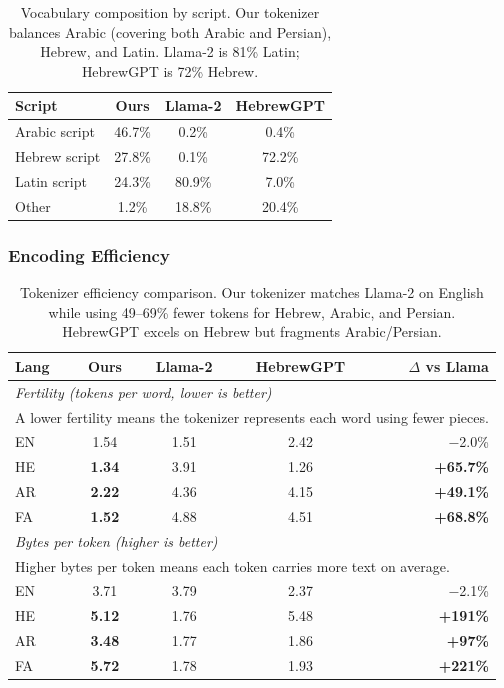 \documentclass[10pt,twocolumn]{article}
\begin{document}
\begin{table}[H]
\centering\small
\begin{tabular}{lccc}
\toprule
\textbf{Script} & \textbf{Ours} & \textbf{Llama-2} & \textbf{HebrewGPT} \\
\midrule
Arabic script & 46.7\% & 0.2\% & 0.4\% \\
Hebrew script & 27.8\% & 0.1\% & 72.2\% \\
Latin script & 24.3\% & 80.9\% & 7.0\% \\
Other & 1.2\% & 18.8\% & 20.4\% \\
\bottomrule
\end{tabular}
\caption{Vocabulary composition by script. Our tokenizer balances Arabic (covering both Arabic and Persian), Hebrew, and Latin. Llama-2 is 81\% Latin; HebrewGPT is 72\% Hebrew.}
\label{tab:vocab_comp}
\end{table}

\subsubsection{Encoding Efficiency}

\begin{table}[H]
\centering\small
\begin{tabular}{lcccr}
\toprule
\textbf{Lang} & \textbf{Ours} & \textbf{Llama-2} & \textbf{HebrewGPT} & \textbf{$\Delta$ vs Llama} \\
\midrule
\multicolumn{5}{l}{\textit{Fertility (tokens per word, lower is better)}} \\
\multicolumn{5}{l}{\scriptsize A lower fertility means the tokenizer represents each word using fewer pieces.} \\
EN & 1.54 & 1.51 & 2.42 & $-$2.0\% \\
HE & \textbf{1.34} & 3.91 & 1.26 & \textbf{+65.7\%} \\
AR & \textbf{2.22} & 4.36 & 4.15 & \textbf{+49.1\%} \\
FA & \textbf{1.52} & 4.88 & 4.51 & \textbf{+68.8\%} \\
\midrule
\multicolumn{5}{l}{\textit{Bytes per token (higher is better)}} \\
\multicolumn{5}{l}{\scriptsize Higher bytes per token means each token carries more text on average.} \\
EN & 3.71 & 3.79 & 2.37 & $-$2.1\% \\
HE & \textbf{5.12} & 1.76 & 5.48 & \textbf{+191\%} \\
AR & \textbf{3.48} & 1.77 & 1.86 & \textbf{+97\%} \\
FA & \textbf{5.72} & 1.78 & 1.93 & \textbf{+221\%} \\
\bottomrule
\end{tabular}
\caption{Tokenizer efficiency comparison. Our tokenizer matches Llama-2 on English while using 49--69\% fewer tokens for Hebrew, Arabic, and Persian. HebrewGPT excels on Hebrew but fragments Arabic/Persian.}
\label{tab:tokenizer}
\end{table}
\end{document}
